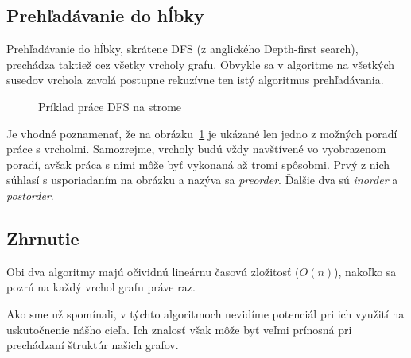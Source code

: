 \subsection{Prehľadávanie do hĺbky}

Prehľadávanie do hĺbky, skrátene DFS (z anglického Depth-first search), prechádza taktiež cez všetky vrcholy grafu. Obvykle sa v algoritme na všetkých susedov vrchola zavolá postupne rekuzívne ten istý algoritmus prehľadávania.\newline

\begin{figure}[H]
  \caption{Príklad práce DFS na strome}
  \label{DFS_priklad}
\end{figure}

Je vhodné poznamenať, že na obrázku~\ref{DFS_priklad} je ukázané len jedno z možných poradí práce s vrcholmi. Samozrejme, vrcholy budú vždy navštívené vo vyobrazenom poradí, avšak práca s nimi môže byť vykonaná až tromi spôsobmi. Prvý z nich súhlasí s usporiadaním na obrázku a nazýva sa \textit{preorder}. Ďalšie dva sú \textit{inorder} a \textit{postorder}.\newline


\subsection{Zhrnutie}

Obi dva algoritmy majú očividnú lineárnu časovú zložitosť ($O(n)$), nakoľko sa pozrú na každý vrchol grafu práve raz.\newline

Ako sme už spomínali, v týchto algoritmoch nevidíme potenciál pri ich využití na uskutočnenie nášho cieľa. Ich znalosť však môže byť veľmi prínosná pri prechádzaní štruktúr našich grafov.\newline


